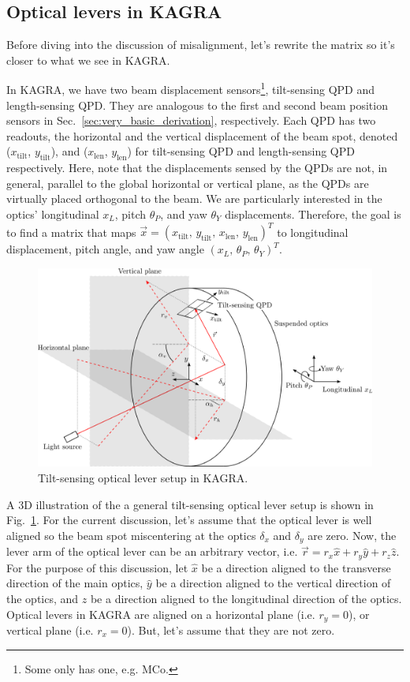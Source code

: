 \subsection{Optical levers in KAGRA \label{sec:optical_levers_in_kagra}}
Before diving into the discussion of misalignment, let's rewrite the matrix so it's closer to what we see in KAGRA.

In KAGRA, we have two beam displacement sensors\footnote{Some only has one, e.g. MCo.}, tilt-sensing QPD and length-sensing QPD. They are analogous to the first and second beam position sensors in Sec.~\ref{sec:very_basic_derivation}, respectively.
Each QPD has two readouts, the horizontal and the vertical displacement of the beam spot, denoted ($x_\mathrm{tilt}$, $y_\mathrm{tilt}$), and ($x_\mathrm{len}$, $y_\mathrm{len}$) for tilt-sensing QPD and length-sensing QPD respectively.
Here, note that the displacements sensed by the QPDs are not, in general, parallel to the global horizontal or vertical plane, as the QPDs are virtually placed orthogonal to the beam.
We are particularly interested in the optics' longitudinal $x_L$, pitch $\theta_P$, and yaw $\theta_Y$ displacements.
Therefore, the goal is to find a matrix that maps $\vec{x}=\left(x_\mathrm{tilt},\, y_\mathrm{tilt},\, x_\mathrm{len},\, y_\mathrm{len}\right)^T$ to longitudinal displacement, pitch angle, and yaw angle $\left(x_L,\, \theta_P,\, \theta_Y\right)^T$.

\begin{figure}[!h]
	\centering
	\includegraphics[width=0.7\linewidth]{figures/kagra_optical_lever_3d}
	\caption{Tilt-sensing optical lever setup in KAGRA.}
	\label{fig:kagraopticallever3d}
\end{figure}

A 3D illustration of the a general tilt-sensing optical lever setup is shown in Fig.~\ref{fig:kagraopticallever3d}.
For the current discussion, let's assume that the optical lever is well aligned so the beam spot miscentering at the optics $\delta_x$ and $\delta_y$ are zero.
Now, the lever arm of the optical lever can be an arbitrary vector, i.e. $\vec{r}=r_x\hat{x}+r_y\hat{y}+r_z\hat{z}$.
For the purpose of this discussion, let $\hat{x}$ be a direction aligned to the transverse direction of the main optics, $\hat{y}$ be a direction aligned to the vertical direction of the optics, and $\hat{z}$ be a direction aligned to the longitudinal direction of the optics.
Optical levers in KAGRA are aligned on a horizontal plane (i.e. $r_y=0$), or vertical plane (i.e. $r_x=0$).
But, let's assume that they are not zero.

